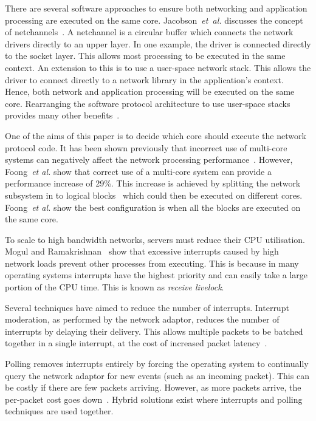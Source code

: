 \documentclass[conference, compsoc]{IEEEtran}
\begin{document}
There are several software approaches to ensure both networking and application processing are executed on the same core. Jacobson~\emph{et~al.} discusses the concept of netchannels~\cite{jacobson2006mph}. A netchannel  is a circular buffer which connects the network drivers directly to an upper layer. In one example, the driver is connected directly to the socket layer. This allows most processing to be executed in the same context. An extension to this is to use a user-space network stack. This allows the driver to connect directly to a network library in the application's context. Hence, both network and application processing will be executed on the same core.  Rearranging the software protocol architecture to use user-space stacks provides many other benefits~\cite{conf/SPECTS/AIPNPCA}.

One of the aims of this paper is to decide which core should execute the network protocol code. It has been shown previously that incorrect use of multi-core systems can negatively affect the network processing performance~\cite{conf/comsware/BhattacharyaA06}. However, Foong~\emph{et al.} show that correct use of a multi-core system can provide a performance increase of 29\%. This increase is achieved by splitting the network subsystem in to logical blocks~\cite{foong2004dai} which could then be executed on different cores. Foong~\emph{et al.} show the best configuration is when all the blocks are executed on the same core.

To scale to high bandwidth networks, servers must reduce their CPU utilisation. Mogul and Ramakrishnan~\cite{263335} show that excessive interrupts caused by high network loads prevent other processes from executing. This is because in many operating systems interrupts have the highest priority and can easily take a large portion of the CPU time. This is known as \emph{receive livelock}.

Several techniques have aimed to reduce the number of interrupts. Interrupt moderation, as performed by the network adaptor, reduces the number of interrupts by delaying their delivery. This allows multiple packets to be batched together in a single interrupt, at the cost of increased packet latency~\cite{DBLP:conf/pam/PrasadJD04}.

Polling removes interrupts entirely by forcing the operating system to continually query the network adaptor for new events (such as an incoming packet). This can be costly if there are few packets arriving. However, as more packets arrive, the per-packet cost goes down~\cite{263335}. Hybrid solutions exist where interrupts and polling techniques are used together.
\end{document}
